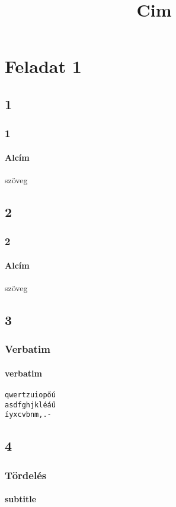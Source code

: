 \documentclass[aspectratio=169, 12pt]{beamer}
\title{Cim}
\begin{document}
\begin{frame}
  \maketitle
\end{frame}


\section{Feladat 1}

\subsection{1}
\begin{frame}
  \frametitle{1}
  \framesubtitle{Alcím}
  szöveg
\end{frame}

\subsection{2}
\begin{frame}
  \frametitle{2}
  \framesubtitle{Alcím}
  szöveg
\end{frame}

\subsection{3}
\begin{frame}[fragile]
  \frametitle{Verbatim}
  \framesubtitle{verbatim}
  \begin{verbatim}
qwertzuiopőú
asdfghjkléáű
íyxcvbnm,.-
  \end{verbatim}
\end{frame}

\subsection{4}
\begin{frame}[allowframebreaks]
  \frametitle{Tördelés}
  \framesubtitle{subtitle}
  \lipsum[3-4]
\end{frame}
\end{document}
